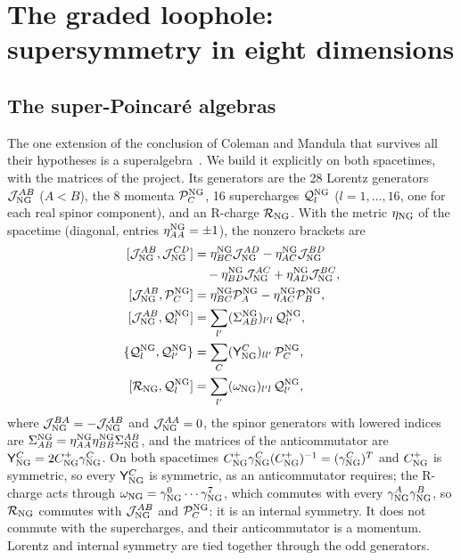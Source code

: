 \section{The graded loophole: supersymmetry in eight dimensions}
\label{sec:susy}

\subsection{The super-Poincar\'e algebras}

The one extension of the conclusion of Coleman and Mandula that survives all their hypotheses is a
superalgebra~\cite{HLS1975,Nahm1978,Strathdee1987}. We build it explicitly on both spacetimes, with
the matrices of the project. Its generators are the 28 Lorentz generators $\mathcal J^{AB}_{\rm NG}$
($A<B$), the 8 momenta $\mathcal P^{\rm NG}_C$, 16 supercharges $\mathcal Q^{\rm NG}_l$ ($l=1,\dots,16$, one
for each real spinor component), and an R-charge $\mathcal R_{\rm NG}$. With the metric
$\eta_{\rm NG}$ of the spacetime (diagonal, entries $\eta_{AA}^{\rm NG}=\pm1$), the nonzero brackets are
\begin{subequations}
\label{eq:superalgebra}
\begin{align}
[\mathcal J^{AB}_{\rm NG},\mathcal J^{CD}_{\rm NG}]&=\eta^{\rm NG}_{BC}\mathcal J^{AD}_{\rm NG}-\eta^{\rm NG}_{AC}\mathcal J^{BD}_{\rm NG}\nonumber\\
&\quad-\eta^{\rm NG}_{BD}\mathcal J^{AC}_{\rm NG}+\eta^{\rm NG}_{AD}\mathcal J^{BC}_{\rm NG},\\
[\mathcal J^{AB}_{\rm NG},\mathcal P^{\rm NG}_C]&=\eta^{\rm NG}_{BC}\mathcal P^{\rm NG}_A-\eta^{\rm NG}_{AC}\mathcal P^{\rm NG}_B,\\
[\mathcal J^{AB}_{\rm NG},\mathcal Q^{\rm NG}_l]&=\sum_{l'}(\Sigma^{\rm NG}_{AB})_{l'l}\,\mathcal Q^{\rm NG}_{l'},\\
\{\mathcal Q^{\rm NG}_l,\mathcal Q^{\rm NG}_{l'}\}&=\sum_C(\mathsf Y^C_{\rm NG})_{ll'}\,\mathcal P^{\rm NG}_C,\\
[\mathcal R_{\rm NG},\mathcal Q^{\rm NG}_l]&=\sum_{l'}(\omega_{\rm NG})_{l'l}\,\mathcal Q^{\rm NG}_{l'},
\end{align}
\end{subequations}
where $\mathcal J^{BA}_{\rm NG}=-\mathcal J^{AB}_{\rm NG}$ and $\mathcal J^{AA}_{\rm NG}=0$, the spinor generators
with lowered indices are $\Sigma^{\rm NG}_{AB}=\eta^{\rm NG}_{AA}\eta^{\rm NG}_{BB}\Sigma^{AB}_{\rm NG}$, and the
matrices of the anticommutator are $\mathsf Y^C_{\rm NG}=2C^+_{\rm NG}\gamma^C_{\rm NG}$. On both spacetimes
$C^+_{\rm NG}\gamma^C_{\rm NG}(C^+_{\rm NG})^{-1}=(\gamma^C_{\rm NG})^T$ and $C^+_{\rm NG}$ is symmetric, so every
$\mathsf Y^C_{\rm NG}$ is symmetric, as an anticommutator requires; the R-charge acts through
$\omega_{\rm NG}=\gamma^0_{\rm NG}\cdots\gamma^7_{\rm NG}$, which commutes with every
$\gamma^A_{\rm NG}\gamma^B_{\rm NG}$, so $\mathcal R_{\rm NG}$ commutes with $\mathcal J^{AB}_{\rm NG}$ and
$\mathcal P^{\rm NG}_C$: it is an internal symmetry. It does not commute with the supercharges, and their
anticommutator is a momentum. Lorentz and internal symmetry are tied together through the odd
generators.

